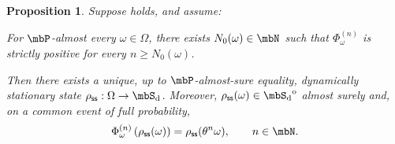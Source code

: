 \documentclass[a4paper]{article}
\numberwithin{equation}{section}   %
\theoremstyle{plain}   %
\theoremstyle{plain}   %
\newtheorem{prop}[lemma]{Proposition}   %
\theoremstyle{examplestyle}
\DeclareMathOperator{\states}{\mbS_d}   %
\DeclareMathOperator{\pr}{\mbP}           %
\newcommand{\s}{\rho_{\mathsf{ss}}}     %
\newcommand{\esp}{{\hyperlink{esp}{ESP}}}
\begin{document}
    \begin{prop}
    \label{prop:esp_stationary_state}
        Suppose  holds, and assume:
        \begin{description}
        \hypertarget{esp}{}
        \item[(\esp)]
            For \(\pr\)-almost every \(\omega\in\Omega\), there exists \(N_0(\omega)\in\mbN\) such that \(\Phi_\omega^{(n)}\) is strictly positive for every \(n\ge N_0(\omega)\).
        \end{description}
        Then there exists a unique, up to \(\pr\)-almost-sure equality, dynamically stationary state \(\s:\Omega\to\states\).
        Moreover, \(\s(\omega)\in\states^{\mathrm o}\) almost surely and, on a common event of full probability,
        \[
            \Phi_\omega^{(n)}\left(\s(\omega)\right)
            =\s(\theta^n\omega),
            \qquad n\in\mbN.
        \]
    \end{prop}
\end{document}
